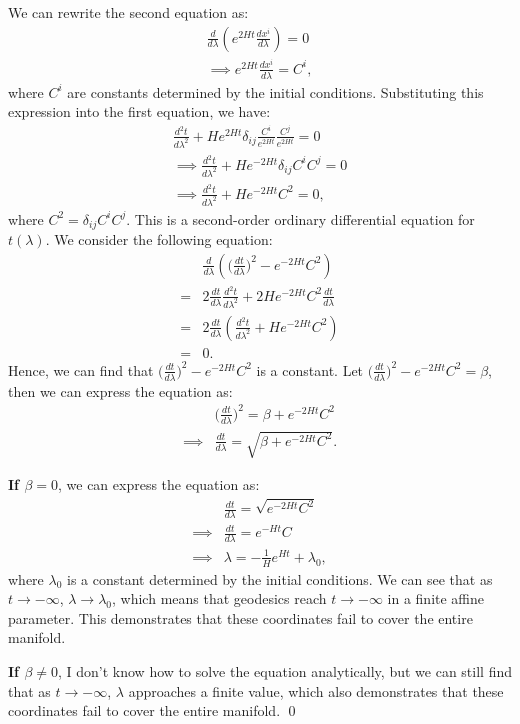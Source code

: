 We can rewrite the second equation as:
\begin{align}
    \frac{d}{d\lambda} \left( e^{2Ht} \frac{dx^i}{d\lambda} \right) = 0\\
    \implies e^{2Ht} \frac{dx^i}{d\lambda} = C^i,
\end{align}
where $C^i$ are constants determined by the initial conditions. Substituting this expression into the first equation, we have:
\begin{align}
    \frac{d^2 t}{d\lambda^2} + H e^{2Ht} \delta_{ij} \frac{C^i}{e^{2Ht}} \frac{C^j}{e^{2Ht}} = 0\\
    \implies \frac{d^2 t}{d\lambda^2} + H e^{-2Ht} \delta_{ij} C^i C^j = 0\\
    \implies \frac{d^2 t}{d\lambda^2} + H e^{-2Ht} C^2 = 0,
\end{align}
where $C^2 = \delta_{ij} C^i C^j$. This is a second-order ordinary differential equation for $t(\lambda)$. We consider the following equation:
\begin{align}
    &\frac{d}{d\lambda} \left( \Big( \frac{d t}{d\lambda} \Big)^2 -  e^{-2Ht} C^2\right)\\
    =& 2 \frac{d t}{d\lambda} \frac{d^2 t}{d\lambda^2} + 2H e^{-2Ht} C^2 \frac{dt}{d\lambda}\\
    =& 2 \frac{d t}{d\lambda} \left( \frac{d^2 t}{d\lambda^2} + H e^{-2Ht} C^2 \right)\\
    =& 0.
\end{align}
Hence, we can find that $\Big( \frac{d t}{d\lambda} \Big)^2 -  e^{-2Ht} C^2$ is a constant. Let $\Big( \frac{d t}{d\lambda} \Big)^2 -  e^{-2Ht} C^2 = \beta$, then we can express the equation as:
\begin{align}
    &\Big( \frac{d t}{d\lambda} \Big)^2 = \beta + e^{-2Ht} C^2\\
    \implies &\frac{d t}{d\lambda} = \sqrt{\beta + e^{-2Ht} C^2}.
\end{align}

\textbf{If $\beta=0$}, we can express the equation as:
\begin{align}
    &\frac{d t}{d\lambda} = \sqrt{e^{-2Ht} C^2}\\
    \implies &\frac{d t}{d\lambda} = e^{-Ht} C\\
    \implies &\lambda = -\frac{1}{H} e^{Ht} + \lambda_0,
\end{align}
where $\lambda_0$ is a constant determined by the initial conditions. We can see that as $t \to -\infty$, $\lambda \to \lambda_0$, which means that geodesics reach $t \to -\infty$ in a finite affine parameter. This demonstrates that these coordinates fail to cover the entire manifold.

\textbf{If $\beta \neq 0$}, I don't know how to solve the equation analytically, but we can still find that as $t \to -\infty$, $\lambda$ approaches a finite value, which also demonstrates that these coordinates fail to cover the entire manifold.
\qed